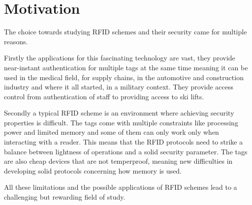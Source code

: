 \chapter*{Motivation} 

The choice towards studying RFID schemes and their security came for multiple reasons. 

Firstly the applications for this fascinating technology are vast, they provide near-instant authentication for multiple tags 
at the same time meaning it can be used in the medical field, for supply chains, in the automotive and construction industry and where 
it all started, in a military context. They provide access control from authentication of staff to providing access to ski lifts.

Secondly a typical RFID scheme is an environment where achieving security properties is difficult. The tags come with multiple 
constraints like processing power and limited memory and some of them can only work only when interacting with a reader. This means 
that the RFID protocols need to strike a balance between lightness of operations and a solid security parameter. 
The tags are also cheap devices that are not temperproof, meaning new difficulties in developing solid protocols concerning how
memory is used.

All these limitations and the possible applications of RFID schemes lead to a challenging but rewarding 
field of study.